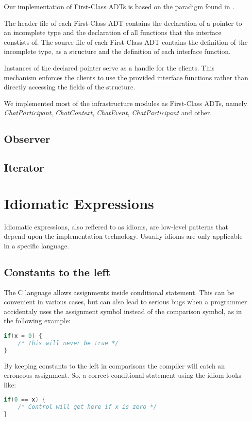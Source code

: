 Our implementation of First-Class ADTs is based on the paradigm found in \cite{patternsinc}.

The header file of each First-Class ADT contains the declaration of a pointer to an incomplete type and the declaration of all functions that the interface constists of. The source file of each First-Class ADT contains the definition of the incomplete type, as a structure and the definition of each interface function.

Instances of the declared pointer serve as a handle for the clients. This mechanism enforces the clients to use the provided interface functions rather than directly accessing the fields of the structure.

We implemented most of the infrastructure modules as First-Class ADTs, namely \textit{ChatParticipant}, \textit{ChatContext}, \textit{ChatEvent}, \textit{ChatParticipant} and other.

\subsection{Observer}

\subsection{Iterator}


\section{Idiomatic Expressions}
Idiomatic expressions, also reffered to as idioms, are low-level patterns that depend upon the implementation technology. Usually idioms are only applicable in a specific language.

\subsection{Constants to the left}
The C language allows assignments inside conditional statement. This can be convenient in various cases, but can also lead to serious bugs when a programmer accidentaly uses the assignment symbol instead of the comparison symbol, as in the following example:
\begin{lstlisting}[language=C]
if(x = 0) {
    /* This will never be true */
}
\end{lstlisting}

By keeping constants to the left in comparisons the compiler will catch an erroneous assignment. So, a correct conditional statement using the idiom looks like:
\begin{lstlisting}[language=C]
if(0 == x) {
    /* Control will get here if x is zero */
}
\end{lstlisting}


